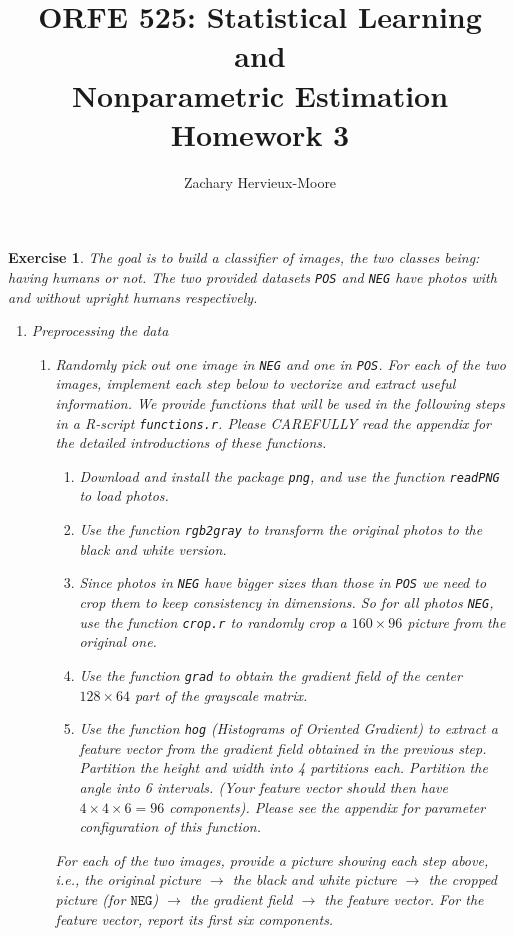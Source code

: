 \documentclass[12pt]{article}
\title{ORFE 525: Statistical Learning and \\ Nonparametric Estimation \\ Homework 3}
\author{Zachary Hervieux-Moore}
\date{\displaydate{date}}
\theoremstyle{colon}
\newtheorem{exercise}{Exercise}
\begin{document}
\maketitle

\clearpage

\begin{exercise}
  The goal is to build a classifier of images, the two classes being: having humans or not. The two provided datasets \texttt{POS} and \texttt{NEG} have photos with and without upright humans respectively.

  \begin{enumerate}[label=\arabic*)]
    \item Preprocessing the data
      \begin{enumerate}[label=\alph*)]
        \item Randomly pick out one image in \texttt{NEG} and one in \texttt{POS}. For each of the two images, implement each step below to vectorize and extract useful information. We provide functions that will be used in the following steps in a R-script \texttt{functions.r}. Please CAREFULLY read the appendix for the detailed introductions of these functions.
          \begin{enumerate}[label=\arabic*)]
            \item Download and install the package \texttt{png}, and use the function \texttt{readPNG} to load photos.
            \item Use the function \texttt{rgb2gray} to transform the original photos to the black and white version.
            \item Since photos in \texttt{NEG} have bigger sizes than those in \texttt{POS} we need to crop them to keep consistency in dimensions. So for all photos \texttt{NEG}, use the function \texttt{crop.r} to randomly crop a $160 \times 96$ picture from the original one.
            \item Use the function \texttt{grad} to obtain the gradient field of the center $128 \times 64$ part of the grayscale matrix.
            \item Use the function \texttt{hog} (Histograms of Oriented Gradient) to extract a feature vector from the gradient field obtained in the previous step. Partition the height and width into 4 partitions each. Partition the angle into 6 intervals. (Your feature vector should then have $4 \times 4 \times 6 = 96$ components). Please see the appendix for parameter configuration of this function.
          \end{enumerate}
          For each of the two images, provide a picture showing each step above, i.e., the original picture $\rightarrow$ the black and white picture $\rightarrow$ the cropped picture (for $\texttt{NEG}$) $\rightarrow$ the gradient field $\rightarrow$ the feature vector. For the feature vector, report its first six components.


\end{enumerate}
\end{enumerate}
\end{exercise}
\end{document}
